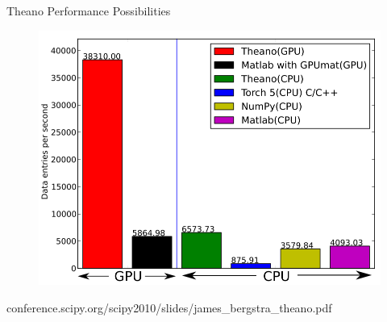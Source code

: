 \documentclass{beamer}
\begin{document}
\begin{frame}{Theano Performance Possibilities}
 \begin{figure}
  \centering \includegraphics[scale=.30]{doc/theano}
  \end{figure}
  conference.scipy.org/scipy2010/slides/james\_bergstra\_theano.pdf
\end{frame}
\end{document}
